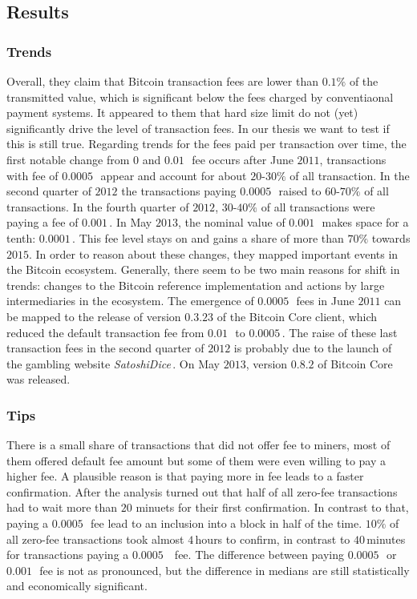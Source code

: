 \subsection{Results}
\subsubsection{Trends}
Overall, they claim that Bitcoin transaction fees are lower than $0.1\%$ of
the transmitted value, which is significant below the fees charged
by conventiaonal payment systems. It appeared to them that hard size limit
do not (yet) significantly drive the level of transaction fees.
In our thesis we want to test if this is still true.
Regarding trends for the fees paid per transaction over time,
the first notable change from $0$ and $0.01$\,\bitcoin~fee
occurs after June $2011$, transactions
with fee of $0.0005$\,\bitcoin~appear and account for
about $20$-$30\%$ of all transaction. In the second quarter
of $2012$ the transactions paying $0.0005$\,\bitcoin~raised
to $60$-$70\%$ of all transactions. In the fourth quarter of
$2012$, $30$-$40\%$ of all transactions were paying a
fee of $0.001$\,\bitcoin. In May $2013$, the nominal value
of $0.001$\,\bitcoin~makes space for a tenth: $0.0001$\,\bitcoin.
This fee level stays on and gains a share of more than $70\%$
towards $2015$. In order to reason about these changes, they
mapped important events in the Bitcoin ecosystem. Generally,
there seem to be two main reasons for shift in trends:
changes to the Bitcoin reference implementation and actions by large
intermediaries in the ecosystem. The emergence of $0.0005$\,\bitcoin~fees
in June $2011$ can be mapped to the release of version $0.3.23$
of the Bitcoin Core client, which reduced the default transaction fee
from $0.01$\,\bitcoin~to $0.0005$\,\bitcoin. The raise of these
last transaction fees in the second quarter of $2012$ is probably
due to the launch of the gambling website \emph{SatoshiDice}\,\cite{satoshidice}.
On May $2013$, version $0.8.2$ of Bitcoin Core was released.

\subsubsection{Tips}
There is a small share of transactions that did not offer fee to miners,
most of them offered default fee amount but some of them
were even willing to pay a higher fee. A plausible reason
is that paying more in fee leads to a faster confirmation.
After the analysis turned out that half of all zero-fee transactions
had to wait more than $20$ minuets for their first confirmation.
In contrast to that, paying a $0.0005$\,\bitcoin~fee lead to an
inclusion into a block in half of the time. $10\%$ of all zero-fee
transactions took almost $4$\,hours to confirm, in contrast
to $40$\,minutes for transactions paying a $0.0005$\,\bitcoin~
fee. The difference between paying $0.0005$\,\bitcoin~or
$0.001$\,\bitcoin~fee is not as pronounced, but the difference
in medians are still statistically and economically significant.

